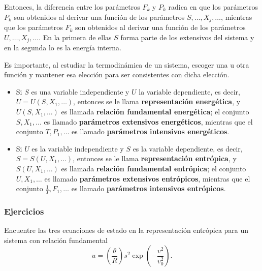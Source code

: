 Entonces, la diferencia entre los parámetros $F_k$ y $P_k$ radica en que los parámetros $P_k$ son
obtenidos al derivar una función de los parámetros $S,\dots,X_j,\dots$, mientras que los
parámetros $F_k$ son obtenidos al derivar una función de los parámetros $U,\dots,X_j,\dots$. En la
primera de ellas $S$ forma parte de los extensivos del sistema y en la segunda lo es la energía
interna.

Es importante, al estudiar la termodinámica de un sistema, escoger una u otra función y mantener
esa elección para ser consistentes con dicha elección.
\begin{itemize}[itemsep=3pt]
  \item Si $S$ es una variable independiente y $U$ la variable dependiente, es decir,
    $U=U(S,X_1,\dots)$, entonces se le llama \textbf{representación energética}, y $U(S,X_1,\dots)$
    es llamada \textbf{relación fundamental energética}; el conjunto $S,X_1,\dots$ es llamado
    \textbf{parámetros extensivos energéticos}, mientras que el conjunto $T,P_1,\dots$ es llamado
    \textbf{parámetros intensivos energéticos}.
  \item Si $U$ es la variable independiente y $S$ es la variable dependiente, es decir,
    $S=S(U,X_1,\dots)$, entonces se le llama \textbf{representación entrópica}, y $S(U,X_1,\dots)$
    es llamada \textbf{relación fundamental entrópica}; el conjunto $U,X_1,\dots$ es llamado
    \textbf{parámetros extensivos entrópicos}, mientras que el conjunto $\tfrac{1}{T},F_1,\dots$ es
    llamado \textbf{parámetros intensivos entrópicos}.
\end{itemize}

\subsubsection*{Ejercicios}

\begin{ejercicio}
  Encuentre las tres ecuaciones de estado en la representación entrópica para un sistema con
  relación fundamental
  \begin{equation*}
    u=\left(\frac{\theta}{R}\right)s^{2}\exp\!\left(-\frac{v^{2}}{v_0^{2}}\right).
  \end{equation*}
\end{ejercicio}

